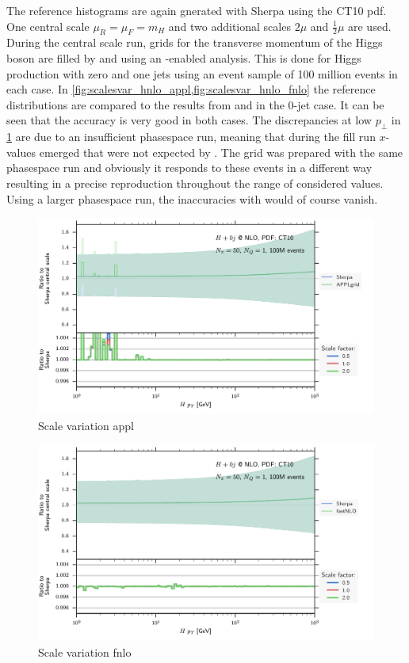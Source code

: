 The reference histograms are again gnerated with Sherpa using the CT10 pdf.
One central scale $\mu_R = \mu_F = m_H$ and two additional scales $2 \mu$ and $\frac{1}{2} \mu$ are used.
During the central scale run, grids for the transverse momentum of the Higgs boson are filled by \appl{} and \fnlo{} using an \mcgrid{}-enabled \rivet{} analysis.
This is done for Higgs production with zero and one jets using an event sample of 100 million events in each case.
In \cref{fig:scalesvar_hnlo_appl,fig:scalesvar_hnlo_fnlo} the reference distributions are compared to the results from \appl{} and \fnlo{} in the 0-jet case.
It can be seen that the accuracy is very good in both cases.
The discrepancies at low $p_\perp$ in \cref{fig:scalesvar_hnlo_appl} are due to an insufficient phasespace run, meaning that during the fill run $x$-values emerged that were not expected by \appl{}.
The \fnlo{} grid was prepared with the same phasespace run and obviously it responds to these events in a different way resulting in a precise reproduction throughout the range of considered values.
Using a larger phasespace run, the inaccuracies with \appl{} would of course vanish.
%
\begin{figure}
	\centering
	\includegraphics[width=\textwidth]{images/scalesvar_hnlo_appl.pdf}
	\caption{Scale variation appl}
	\label{fig:scalesvar_hnlo_appl}
\end{figure}
%
\begin{figure}
	\centering
	\includegraphics[width=\textwidth]{images/scalesvar_hnlo_fnlo.pdf}
	\caption{Scale variation fnlo}
	\label{fig:scalesvar_hnlo_fnlo}
\end{figure}
